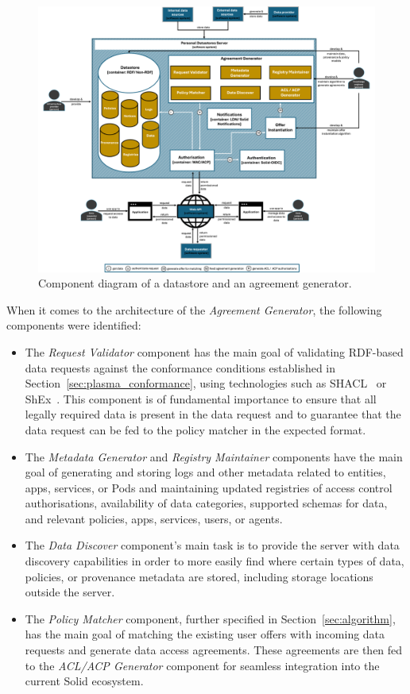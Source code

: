 \begin{figure}[t]
    \centering
    \includegraphics[width=1.1\linewidth]{figures//chapter-6/component.png}
    \caption{Component diagram of a datastore and an agreement generator.}
    \label{fig:c4-component}
\end{figure}

When it comes to the architecture of the \textit{Agreement Generator}, the following components were identified:

\begin{itemize}
    \item The \textit{Request Validator} component has the main goal of validating RDF-based data requests against the conformance conditions established in Section~\ref{sec:plasma_conformance}, using technologies such as SHACL~\citep{knublauch_shapes_2017} or ShEx~\citep{prudhommeaux_shape_2019}. This component is of fundamental importance to ensure that all legally required data is present in the data request and to guarantee that the data request can be fed to the policy matcher in the expected format.
    \item The \textit{Metadata Generator} and \textit{Registry Maintainer} components have the main goal of generating and storing logs and other metadata related to entities, apps, services, or Pods and maintaining updated registries of access control authorisations, availability of data categories, supported schemas for data, and relevant policies, apps, services, users, or agents.
    \item The \textit{Data Discover} component's main task is to provide the server with data discovery capabilities in order to more easily find where certain types of data, policies, or provenance metadata are stored, including storage locations outside the server.
    \item The \textit{Policy Matcher} component, further specified in Section~\ref{sec:algorithm}, has the main goal of matching the existing user offers with incoming data requests and generate data access agreements. These agreements are then fed to the \textit{ACL/ACP Generator} component for seamless integration into the current Solid ecosystem.
\end{itemize}

